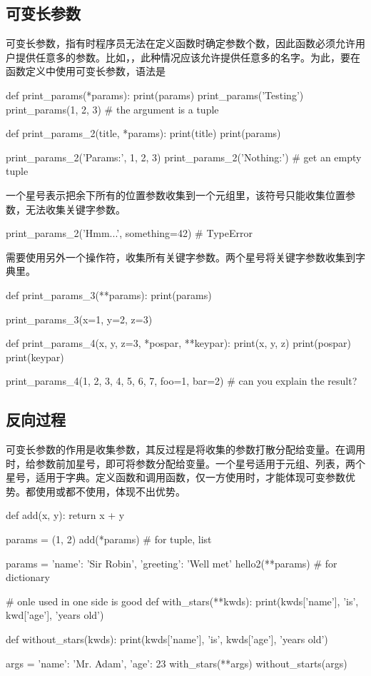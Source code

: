 \subsection{可变长参数}
可变长参数，指有时程序员无法在定义函数时确定参数个数，因此函数必须允许用户提供任意多的参数。比如，，此种情况应该允许提供任意多的名字。为此，要在函数定义中使用可变长参数，语法是
\begin{python}
def print_params(*params):
    print(params)
    print_params('Testing')
    print_params(1, 2, 3) # the argument is a tuple

def print_params_2(title, *params):
    print(title)
    print(params)

print_params_2('Params:', 1, 2, 3)
print_params_2('Nothing:')  # get an empty tuple
\end{python}
一个星号表示把余下所有的位置参数收集到一个元组里，该符号只能收集位置参数，无法收集关键字参数。
\begin{python}
print_params_2('Hmm...', something=42)  # TypeError
\end{python}
需要使用另外一个操作符，收集所有关键字参数。两个星号将关键字参数收集到字典里。
\begin{python}
def print_params_3(**params):
    print(params)

print_params_3(x=1, y=2, z=3)

def print_params_4(x, y, z=3, *pospar, **keypar):
    print(x, y, z)
    print(pospar)
    print(keypar)

print_params_4(1, 2, 3, 4, 5, 6, 7, foo=1, bar=2)  # can you explain the result?
\end{python}
\subsection{反向过程}
可变长参数的作用是收集参数，其反过程是将收集的参数打散分配给变量。在调用时，给参数前加星号，即可将参数分配给变量。一个星号适用于元组、列表，两个星号，适用于字典。定义函数和调用函数，仅一方使用时，才能体现可变参数优势。都使用或都不使用，体现不出优势。
\begin{python}
def add(x, y):
    return x + y

params = (1, 2)
add(*params)  #  for tuple, list

params = {'name': 'Sir Robin', 'greeting': 'Well met'}
hello2(**params)  # for dictionary

# onle used in one side is good
def with_stars(**kwds):
    print(kwds['name'], 'is', kwd['age'], 'years old')

def without_stars(kwds):
    print(kwds['name'], 'is', kwds['age'], 'years old')

args = {'name': 'Mr. Adam', 'age': 23}
with_stars(**args)
without_starts(args)
\end{python}
